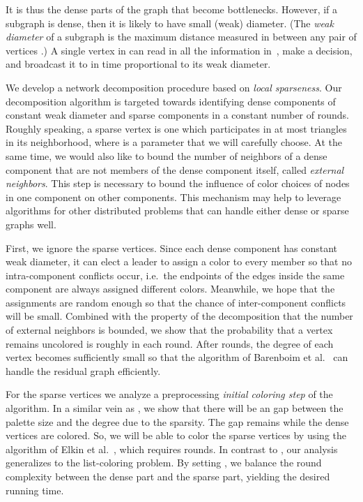 \documentclass[11pt]{amsart}
\begin{document}
It is thus the dense parts of the graph that become bottlenecks. However, if a subgraph is dense, then it is likely to have small (weak) diameter. (The {\it weak diameter} of a subgraph  is the maximum distance measured in  between any pair of vertices .) A single vertex in  can read in all the information in~, make a decision, and broadcast it to  in time proportional to its weak diameter.

We develop a network decomposition procedure based on \emph{local sparseness}. Our decomposition algorithm is targeted towards identifying dense components of constant weak diameter and sparse components in a constant number of rounds. Roughly speaking, a sparse vertex is one which participates in at most  triangles in its neighborhood, where  is a parameter that we will carefully choose. At the same time, we would also like to bound the number of neighbors of a dense component that are not members of the dense component itself, called \emph{external neighbors}. This step is necessary to bound the influence of color choices of nodes in one component on other components. This mechanism may help to leverage algorithms for other distributed problems that can handle either dense or sparse graphs well.

First, we ignore the sparse vertices. Since each dense component has constant weak diameter, it can elect a leader to assign a color to every member so that no intra-component conflicts occur, i.e.~the endpoints of the edges inside the same component are always assigned different colors. Meanwhile, we hope that the assignments are random enough so that the chance of inter-component conflicts will be small.
Combined with the property of the decomposition that the number of external neighbors is bounded, we show that the probability that a vertex remains uncolored is roughly  in each round. After  rounds, the degree of each vertex becomes sufficiently small so that the algorithm of Barenboim et al.~\cite{bar15a} can handle the residual graph efficiently.

For the sparse vertices we analyze a preprocessing {\it initial coloring step} of the algorithm. In a similar vein as \cite{elk15}, we show that there will be an  gap between the palette size and the degree due to the sparsity. The gap remains while the dense vertices are colored. So, we will be able to color the sparse vertices by using the algorithm of Elkin et al.~\cite{elk15}, which requires  rounds. In contrast to \cite{elk15}, our analysis generalizes to the list-coloring problem. By setting , we balance the round complexity between the dense part and the sparse part, yielding the desired running time.
\end{document}
